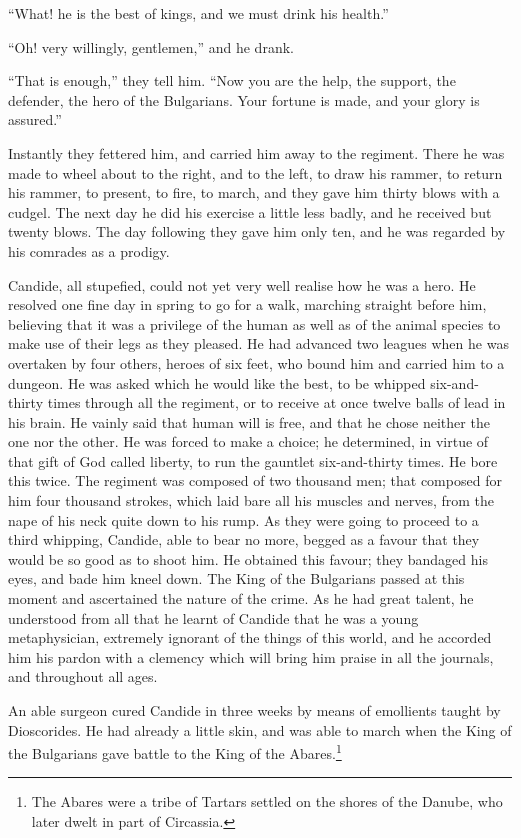 ``What! he is the best of kings, and we must drink his health.''

``Oh! very willingly, gentlemen,'' and he drank.

``That is enough,'' they tell him. ``Now you are the help, the support, the defender, the hero of the Bulgarians. Your fortune is made, and your glory is assured.''

Instantly they fettered him, and carried him away to the regiment. There he was made to wheel about to the right, and to the left, to draw his rammer, to return his rammer, to present, to fire, to march, and they gave him thirty blows with a cudgel. The next day he did his exercise a little less badly, and he received but twenty blows. The day following they gave him only ten, and he was regarded by his comrades as a prodigy.

Candide, all stupefied, could not yet very well realise how he was a hero. He resolved one fine day in spring to go for a walk, marching straight before him, believing that it was a privilege of the human as well as of the animal species to make use of their legs as they pleased. He had advanced two leagues when he was overtaken by four others, heroes of six feet, who bound him and carried him to a dungeon. He was asked which he would like the best, to be whipped six-and-thirty times through all the regiment, or to receive at once twelve balls of lead in his brain. He vainly said that human will is free, and that he chose neither the one nor the other. He was forced to make a choice; he determined, in virtue of that gift of God called liberty, to run the gauntlet six-and-thirty times. He bore this twice. The regiment was composed of two thousand men; that composed for him four thousand strokes, which laid bare all his muscles and nerves, from the nape of his neck quite down to his rump. As they were going to proceed to a third whipping, Candide, able to bear no more, begged as a favour that they would be so good as to shoot him. He obtained this favour; they bandaged his eyes, and bade him kneel down. The King of the Bulgarians passed at this moment and ascertained the nature of the crime. As he had great talent, he understood from all that he learnt of Candide that he was a young metaphysician, extremely ignorant of the things of this world, and he accorded him his pardon with a clemency which will bring him praise in all the journals, and throughout all ages.

An able surgeon cured Candide in three weeks by means of emollients taught by Dioscorides. He had already a little skin, and was able to march when the King of the Bulgarians gave battle to the King of the Abares.\footnote{The Abares were a tribe of Tartars settled on the shores of the Danube, who later dwelt in part of Circassia.}
